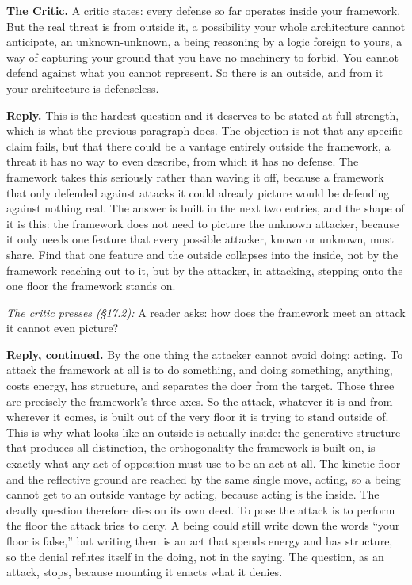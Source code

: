 \documentclass[10pt,twocolumn]{article}
\begin{document}
\textbf{The Critic.} A critic states: every defense so far operates
inside your framework. But the real threat is from outside it, a
possibility your whole architecture cannot anticipate, an
unknown-unknown, a being reasoning by a logic foreign to yours, a way of
capturing your ground that you have no machinery to forbid. You cannot
defend against what you cannot represent. So there is an outside, and
from it your architecture is defenseless.

\textbf{Reply.} This is the hardest question and it deserves to be
stated at full strength, which is what the previous paragraph does. The
objection is not that any specific claim fails, but that there could be
a vantage entirely outside the framework, a threat it has no way to even
describe, from which it has no defense. The framework takes this
seriously rather than waving it off, because a framework that only
defended against attacks it could already picture would be defending
against nothing real. The answer is built in the next two entries, and
the shape of it is this: the framework does not need to picture the
unknown attacker, because it only needs one feature that every possible
attacker, known or unknown, must share. Find that one feature and the
outside collapses into the inside, not by the framework reaching out to
it, but by the attacker, in attacking, stepping onto the one floor the
framework stands on.

\emph{The critic presses (§17.2):} A reader asks: how does the framework
meet an attack it cannot even picture?

\textbf{Reply, continued.} By the one thing the attacker cannot avoid
doing: acting. To attack the framework at all is to do something, and
doing something, anything, costs energy, has structure, and separates
the doer from the target. Those three are precisely the framework's
three axes. So the attack, whatever it is and from wherever it comes, is
built out of the very floor it is trying to stand outside of. This is
why what looks like an outside is actually inside: the generative
structure that produces all distinction, the orthogonality the framework
is built on, is exactly what any act of opposition must use to be an act
at all. The kinetic floor and the reflective ground are reached by the
same single move, acting, so a being cannot get to an outside vantage by
acting, because acting is the inside. The deadly question therefore dies
on its own deed. To pose the attack is to perform the floor the attack
tries to deny. A being could still write down the words ``your floor is
false,'' but writing them is an act that spends energy and has
structure, so the denial refutes itself in the doing, not in the saying.
The question, as an attack, stops, because mounting it enacts what it
denies.
\end{document}
